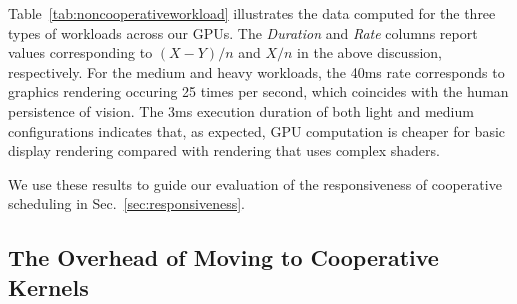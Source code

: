 \documentclass[numbers,nocopyrightspace,10pt]{sigplanconf}
\newcommand{\mytablong}{Table~}
\newcommand{\mysec}{Sec.~}
\begin{document}
\mytablong\ref{tab:noncooperativeworkload} illustrates the data
computed for the three types of workloads across our GPUs.  The
\emph{Duration} and \emph{Rate} columns report values corresponding to
$(X-Y)/n$ and $X/n$ in the above discussion, respectively.  For the
medium and heavy workloads, the 40ms rate corresponds to graphics
rendering occuring 25 times per second, which coincides with the human
persistence of vision. The 3ms execution duration of both light and
medium configurations indicates that, as expected, GPU computation is
cheaper for basic display rendering compared with rendering that uses
complex shaders.

We use these results to guide our evaluation of the responsiveness of
cooperative scheduling in \mysec\ref{sec:responsiveness}.

\subsection{The Overhead of Moving to Cooperative Kernels}\label{sec:overhead}

\end{document}
